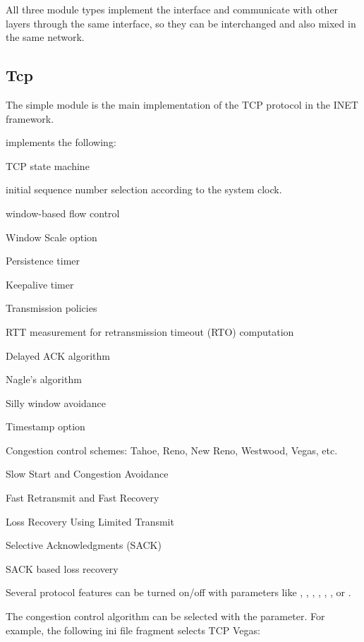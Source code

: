 All three module types implement the  interface and communicate
with other layers through the same interface, so they can be interchanged and
also mixed in the same network.


\subsection{Tcp}
\label{sec:tcp_module}

The  simple module is the main implementation of the TCP protocol
in the INET framework.

 implements the following:

\begin{compactitem}
  \item TCP state machine
  \item initial sequence number selection according to the system clock.
  \item window-based flow control
  \item Window Scale option
  \item Persistence timer
  \item Keepalive timer
  \item Transmission policies
  \item RTT measurement for retransmission timeout (RTO) computation
  \item Delayed ACK algorithm
  \item Nagle's algorithm
  \item Silly window avoidance
  \item Timestamp option
  \item Congestion control schemes: Tahoe, Reno, New Reno, Westwood, Vegas, etc.
  \item Slow Start and Congestion Avoidance
  \item Fast Retransmit and Fast Recovery
  \item Loss Recovery Using Limited Transmit
  \item Selective Acknowledgments (SACK)
  \item SACK based loss recovery
\end{compactitem}

Several protocol features can be turned on/off with parameters like
, , ,
, , , or
.

The congestion control algorithm can be selected with the 
parameter. For example, the following ini file fragment selects TCP Vegas:

